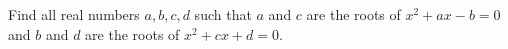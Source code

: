 Find all real numbers $a,b,c,d$ such that $a$ and $c$ are the roots of $x^2+ax-b=0$ and $b$ and $d$ are the roots of $x^2+cx+d=0$.
